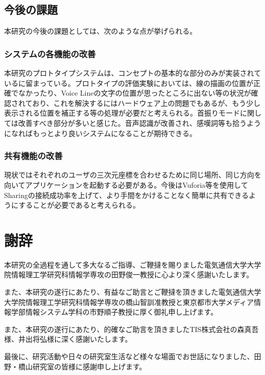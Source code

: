 \documentclass[11pt,a4j, titlepage]{jarticle} %
\begin{document}
\subsection{今後の課題}
本研究の今後の課題としては、次のような点が挙げられる。

\subsubsection*{システムの各機能の改善}
本研究のプロトタイプシステムは、コンセプトの基本的な部分のみが実装されているに留まっている。プロトタイプの評価実験においては、線の描画の位置が正確でなかったり、Voice Lineの文字の位置が思ったところに出ない等の状況が確認されており、これを解決するにはハードウェア上の問題でもあるが、もう少し表示される位置を補正する等の処理が必要だと考えられる。首振りモードに関しては改善すべき部分が多いと感じた。音声認識が改善され、感嘆詞等も拾うようになればもっとより良いシステムになることが期待できる。

\subsubsection*{共有機能の改善}
現状ではそれぞれのユーザの三次元座標を合わせるために同じ場所、同じ方向を向いてアプリケーションを起動する必要がある。今後はVuforia等を使用してSharingの接続成功率を上げて、より手間をかけることなく簡単に共有できるようにすることが必要であると考えられる。

\newpage
\section*{謝辞}
本研究の全過程を通して多大なるご指導、ご鞭撻を賜りました電気通信大学大学院情報理工学研究科情報学専攻の田野俊一教授に心より深く感謝いたします。

また、本研究の遂行にあたり、有益なご助言とご鞭撻を頂きました電気通信大学大学院情報理工学研究科情報学専攻の橋山智訓准教授と東京都市大学メディア情報学部情報システム学科の市野順子教授に厚く御礼申し上げます。

また、本研究の遂行にあたり、的確なご助言を頂きましたTIS株式会社の森真吾様、井出将弘様に深く感謝いたします。

最後に、研究活動や日々の研究室生活など様々な場面でお世話になりました、田野・橋山研究室の皆様に感謝申し上げます。
\end{document}
